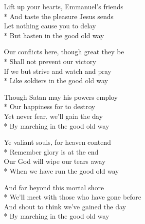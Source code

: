 

\versemark
Lift up your hearts, Emmanuel’s friends\\*
And taste the pleasure Jesus sends\\
Let nothing cause you to delay\\*
But hasten in the good old way


\versemark
Our conflicts here, though great they be\\*
Shall not prevent our victory\\
If we but strive and watch and pray\\*
Like soldiers in the good old way

\versemark
Though Satan may his powers employ\\*
Our happiness for to destroy\\
Yet never fear, we’ll gain the day\\*
By marching in the good old way

\versemark
Ye valiant souls, for heaven contend\\*
Remember glory is at the end\\
Our God will wipe our tears away\\*
When we have run the good old way

\versemark
And far beyond this mortal shore\\*
We’ll meet with those who have gone before\\
And shout to think we’ve gained the day\\*
By marching in the good old way

